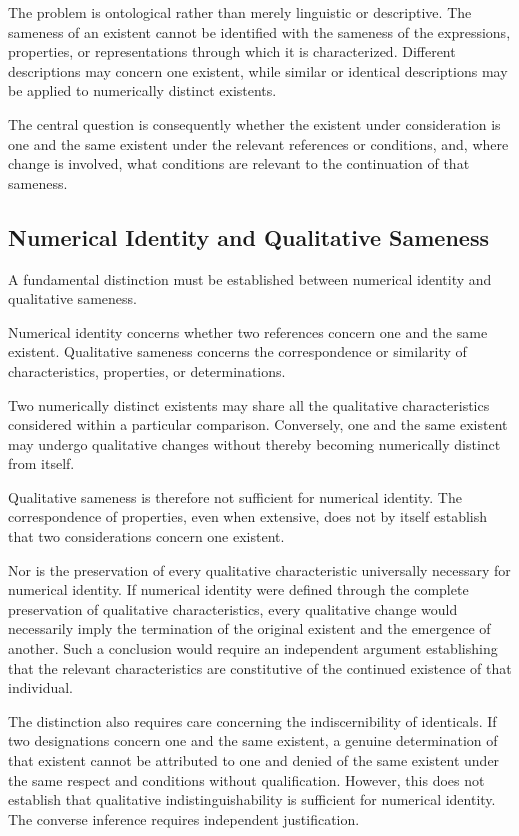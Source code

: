 The problem is ontological rather than merely linguistic
or descriptive. The sameness of an existent cannot be
identified with the sameness of the expressions, properties,
or representations through which it is characterized.
Different descriptions may concern one existent, while
similar or identical descriptions may be applied to
numerically distinct existents.

The central question is consequently whether the existent
under consideration is one and the same existent under
the relevant references or conditions, and, where change
is involved, what conditions are relevant to the continuation
of that sameness.

\subsection{Numerical Identity and Qualitative Sameness}

A fundamental distinction must be established between
numerical identity and qualitative sameness.

Numerical identity concerns whether two references concern
one and the same existent. Qualitative sameness concerns
the correspondence or similarity of characteristics,
properties, or determinations.

Two numerically distinct existents may share all the
qualitative characteristics considered within a particular
comparison. Conversely, one and the same existent may
undergo qualitative changes without thereby becoming
numerically distinct from itself.

Qualitative sameness is therefore not sufficient for
numerical identity. The correspondence of properties,
even when extensive, does not by itself establish that
two considerations concern one existent.

Nor is the preservation of every qualitative characteristic
universally necessary for numerical identity. If numerical
identity were defined through the complete preservation
of qualitative characteristics, every qualitative change
would necessarily imply the termination of the original
existent and the emergence of another. Such a conclusion
would require an independent argument establishing that
the relevant characteristics are constitutive of the
continued existence of that individual.

The distinction also requires care concerning the
indiscernibility of identicals. If two designations concern
one and the same existent, a genuine determination of
that existent cannot be attributed to one and denied
of the same existent under the same respect and conditions
without qualification. However, this does not establish
that qualitative indistinguishability is sufficient for
numerical identity. The converse inference requires
independent justification.

